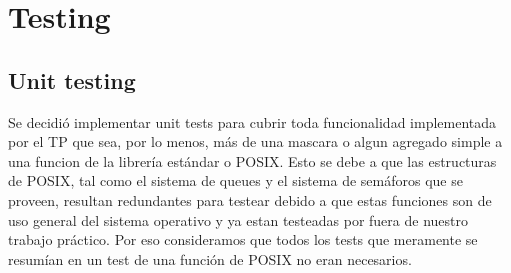 \documentclass[10pt,a4paper]{report}
\begin{document}

\chapter{Testing}
\section{Unit testing}
Se decidió implementar unit tests para cubrir toda funcionalidad implementada por el TP que sea, por lo menos, más de una mascara o algun agregado simple a una funcion de la librería estándar o POSIX. 
Esto se debe a que las estructuras de POSIX, tal como el sistema de queues y el sistema de semáforos que se proveen, resultan redundantes para testear debido a que estas funciones son de uso general del sistema operativo y ya estan testeadas por fuera de nuestro trabajo práctico. Por eso consideramos que todos los tests que meramente se resumían en un test de una función de POSIX no eran necesarios.
\end{document}

